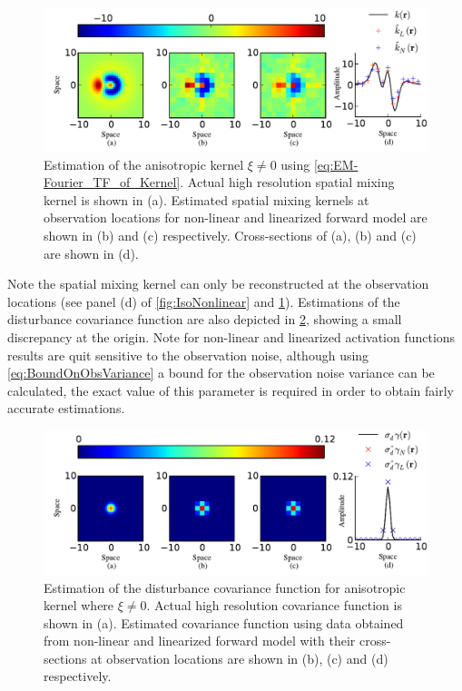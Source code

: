 \documentclass[10pt,twocolumn,twoside]{IEEEtran}
\begin{document}
 \begin{figure}[]
	\centering
		\includegraphics[scale=1]{./Graph/AnisoKernelIEEE1.pdf}
	\caption{Estimation of the anisotropic kernel $\xi\neq 0$ using \eqref{eq:EM-Fourier_TF_of_Kernel}.
Actual high resolution spatial mixing kernel is shown in (a).
Estimated spatial mixing kernels at observation locations for non-linear and linearized forward model are shown in (b) and (c) respectively.
Cross-sections of (a), (b) and (c) are shown in (d).}
	\label{fig:AnisoNonlinear}
\end{figure}

 Note the spatial mixing kernel can only be reconstructed at the observation locations (see panel (d) of \figurename{\ref{fig:IsoNonlinear}} and \figurename{\ref{fig:AnisoNonlinear}}).
Estimations of the disturbance covariance function are also depicted in \figurename{\ref{fig:DisturbanceNon}}, showing a small discrepancy at the origin.
Note for non-linear and linearized activation functions results are quit sensitive to the observation noise, although using \eqref{eq:BoundOnObsVariance} a bound for the observation noise variance can be calculated, the exact value of this parameter is required in order to obtain fairly accurate estimations.

\begin{figure}[]   
	\centering
		\includegraphics[scale=1]{./Graph/DisturbanceWidthEstimation.pdf}
	\caption{Estimation of the disturbance covariance function for anisotropic kernel where $\xi \neq 0$.
Actual high resolution covariance function is shown in (a).
Estimated covariance function using data obtained from non-linear and linearized forward model with their cross-sections at observation locations are shown in  (b), (c) and (d) respectively.}
	\label{fig:DisturbanceNon}
\end{figure}
\end{document}
